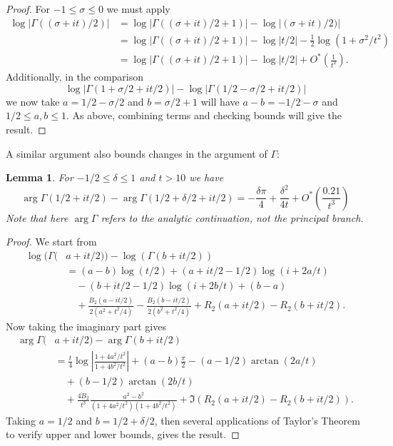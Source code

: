 \documentclass[10pt,english,letter, reqno]{amsart}
\newcommand{\Ostar}{O^{\ast}}
\theoremstyle{plain}
\newtheorem{lemma}[theorem]{Lemma}
\theoremstyle{definition}
\begin{document}
\begin{proof}
 For $-1\leq \sigma \leq 0$ we must apply
\begin{align*}
\log|\Gamma((\sigma+it)/2)| &= \log|\Gamma((\sigma+it)/2+1)| - \log|(\sigma+it)/2)| \\
&=  \log|\Gamma((\sigma+it)/2+1)| - \log|t/2| - \frac{1}{2}\log(1 + \sigma^2/t^2) \\
&= \log|\Gamma((\sigma+it)/2+1)|  - \log|t/2| + \Ostar\!\left(\frac{1}{t^2}\right).
\end{align*} 
Additionally, in the comparison
 \[  \log|\Gamma(1+\sigma/2+it/2)| - \log|\Gamma(1/2-\sigma/2+it/2)| \]
we now take $a=1/2-\sigma/2$ and $b=\sigma/2+1$ will have $a-b=-1/2-\sigma$ and $1/2\leq a,b\leq 1$. As above, combining terms and checking bounds will give the result.
\end{proof}


A similar argument also bounds changes in the argument of $\Gamma$:
\begin{lemma}\label{lemma:argGamma}
For $-1/2 \leq \delta \leq 1$ and $t>10$ we have
\[ \arg\Gamma(1/2+it/2) - \arg\Gamma(1/2+\delta/2+it/2) = -\frac{\delta\pi}{4} + \frac{\delta^2}{4t} + \Ostar\!\left(\frac{0.21}{t^3}\right)\]
Note that here $\arg\Gamma$ refers to the analytic continuation, not the principal branch.
\end{lemma}
\begin{proof}
We start from 
\begin{align*}
 \log(\Gamma(& a+it/2))- \log(\Gamma(b+it/2)) \\
 &= (a-b)\log(t/2) + (a+it/2-1/2)\log(i+2a/t)
 \\&\quad - (b+it/2-1/2)\log(i+2b/t) + (b-a)
 \\&\quad+ \frac{B_2(a-it/2)}{2(a^2+t^2/4)} - \frac{B_2(b-it/2)}{2(b^2+t^2/4)} + R_2(a+it/2) - R_2(b+it/2).
\end{align*}
Now taking the imaginary part gives
\begin{align*}
 \arg\Gamma(& a+it/2)- \arg\Gamma(b+it/2) \\
  &= \frac{t}{4}\log\left|\frac{1+4a^2/t^2}{1+4b^2/t^2} \right| + (a-b)\frac{\pi}{2} - (a-1/2)\arctan(2a/t)
  \\&\quad + (b-1/2)\arctan(2b/t)
  \\&\quad+ \frac{4B_2}{t^3} \frac{a^2 - b^2}{(1+4a^2/t^2)(1+4b^2/t^2)} + \Im( R_2(a+it/2) - R_2(b+it/2) ).
\end{align*}
Taking $a=1/2$ and $b=1/2+\delta/2$, then several applications of Taylor's Theorem to verify upper and lower bounds, gives the result.
\end{proof}
\end{document}
